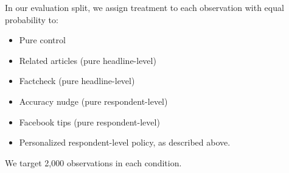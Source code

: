 \documentclass[letterpaper, 12pt, parskip=full,DIV=10]{scrartcl}
\begin{document}
In our evaluation split, we assign treatment to each observation with equal probability to:
\begin{itemize}
\item Pure control
\item Related articles (pure headline-level)
\item Factcheck (pure headline-level)
\item Accuracy nudge (pure respondent-level)
\item Facebook tips (pure respondent-level)
\item Personalized respondent-level policy, as described above. 
\end{itemize}
We target 2,000 observations in each condition. 
\end{document}
